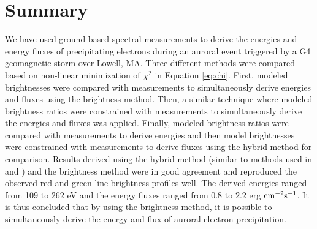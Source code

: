 \documentclass[crop=false,class=mitthesis,oneside,font=12pt]{standalone}
\begin{document}
\section{Summary}
We have used ground-based spectral measurements to derive the energies and energy fluxes of precipitating electrons during an auroral event triggered by a G4 geomagnetic storm over Lowell, MA. Three different methods were compared based on non-linear minimization of $\chi^2$ in Equation \ref{eq:chi}. First, modeled brightnesses were compared with measurements to simultaneously derive energies and fluxes using the brightness method. Then, a similar technique where modeled brightness ratios were constrained with measurements to simultaneously derive the energies and fluxes was applied. Finally, modeled brightness ratios were compared with measurements to derive energies and then model brightnesses were constrained with measurements to derive fluxes using the hybrid method for comparison.  
Results derived using the hybrid method (similar to methods used in \cite{rees_1974} and \cite{pallamraju_2011}) and the brightness method were in good agreement and reproduced the observed red and green line brightness profiles well. The derived energies ranged from 109 to 262 eV and the  energy fluxes ranged from 0.8 to 2.2 erg $\rm cm^{-2} s^{-1}$. It is thus concluded that by using the brightness method, it is possible to simultaneously derive the energy and flux of auroral electron precipitation.
\end{document}
